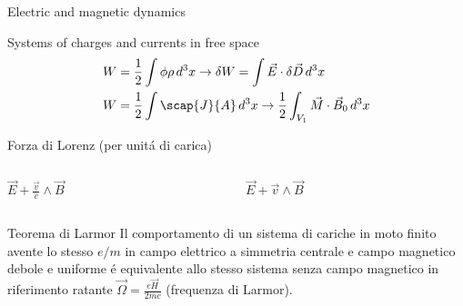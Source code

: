 \begin{frame}{Electric and magnetic dynamics}
\begin{block}{Systems of charges and currents in free space}
\begin{align*}
&W=\frac{1}{2}\int\phi\rho\,d^3x\to\delta W=\int\vec{E}\cdot\delta\vec{D}\,d^3x\\
&W=\frac{1}{2}\int\scap{J}{A}\,d^3x\to\frac{1}{2}\int_{V_1}\vec{M}\cdot\vec{B}_0\,d^3x
\end{align*}
\end{block}
\begin{block}{Forza di Lorenz (per unit\'a di carica)}
\begin{columns}[T]
\begin{column}{0.5\textwidth}
$\vec{E}+\frac{\vec{v}}{c}\wedge\vec{B}$
\end{column}
\begin{column}{0.5\textwidth}
$\vec{E}+\vec{v}\wedge\vec{B}$
\end{column}
\end{columns}
\end{block}
\begin{block}{Teorema di Larmor}
Il comportamento di un sistema di cariche in moto finito avente lo stesso $e/m$ in campo elettrico a simmetria centrale e campo magnetico debole e uniforme \'e equivalente allo stesso sistema senza campo magnetico in riferimento ratante $\vec{\Omega}=\frac{e\vec{H}}{2mc}$ (frequenza di Larmor).


\end{block}
\end{frame}

